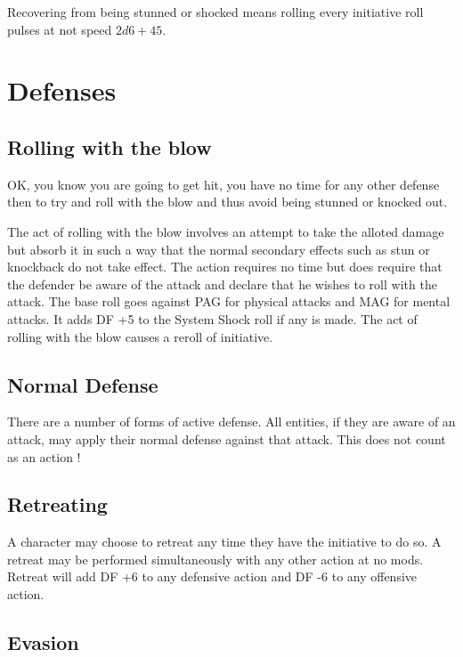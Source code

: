 Recovering from being stunned or shocked means rolling every initiative roll pulses at not speed 
\( 2d6 + 45 \).

\section{{Defenses}}

\subsection{Rolling with the blow}

OK, you know you are going to get hit, you have no time for any other defense then to 
try and roll with the blow and thus avoid being stunned or knocked out.

The act of rolling with the blow involves an attempt to take the
alloted damage but absorb it in such a way that the normal secondary
effects such as stun or knockback do not take effect. The action
requires no time but does require that the defender be aware of the
attack and declare that he wishes to roll with the attack. The base
roll goes against PAG for physical attacks and MAG for mental
attacks. It adds DF +5 to the System Shock roll if any is made.
The act of rolling with the blow causes a reroll of initiative.

\subsection{{Normal Defense}}

There are a number of forms of active defense. All entities, if they
are aware of an attack, may apply their normal defense against that
attack. This does not count as an action !

\subsection{{Retreating}}

A character may choose to retreat any time they have the initiative to do so.
A retreat may be performed simultaneously with any other action at no mods.
Retreat will add DF +6 to any defensive action and DF -6 to any offensive action.

\subsection{{Evasion}}

